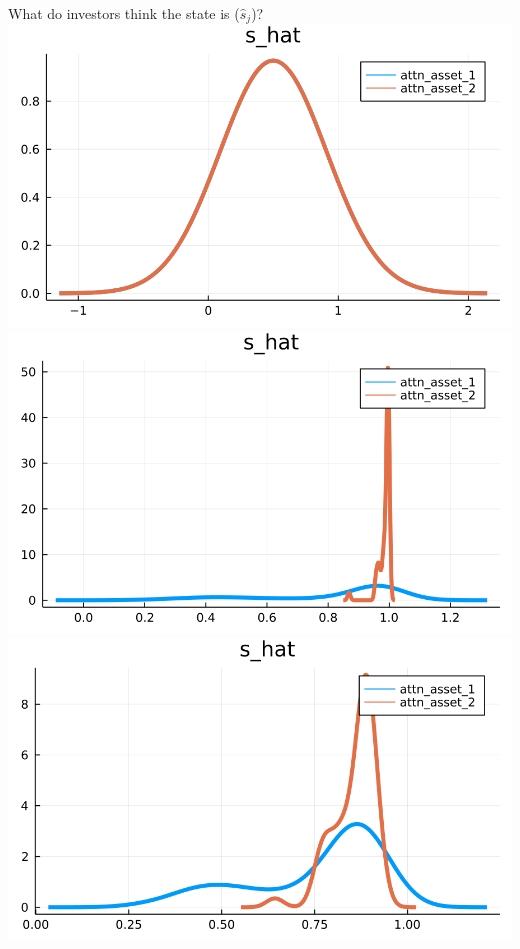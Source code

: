 \documentclass[
  ignorenonframetext,
]{beamer}
\begin{document}
\begin{frame}{What do investors think the state is (\(\hat s_j\))?}
\protect\hypertarget{what-do-investors-think-the-state-is-hat-s_j}{}
\includegraphics[width=0.4\paperheight]{complexity_files/figure-beamer/unnamed-chunk-17-1}
\includegraphics[width=0.4\paperheight]{complexity_files/figure-beamer/unnamed-chunk-17-2}
\includegraphics[width=0.4\paperheight]{complexity_files/figure-beamer/unnamed-chunk-17-3}

\end{frame}
\end{document}
